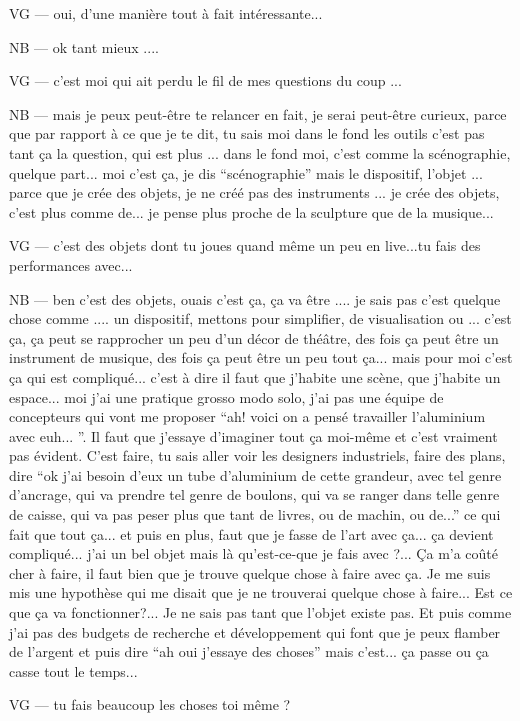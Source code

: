 VG — oui, d'une manière tout à fait intéressante...

NB — ok tant mieux ....

VG — c'est moi qui ait perdu le fil de mes questions du coup ... 

NB — mais je peux peut-être te relancer en fait, je serai peut-être curieux, parce que par rapport à ce que je te dit, tu sais moi dans le fond les outils c'est pas tant ça la question, qui est plus ... dans le fond moi, c'est comme la scénographie, quelque part... moi c'est ça, je dis ``scénographie'' mais le dispositif, l'objet ...  parce que je crée des objets, je ne créé pas des instruments ... je crée des objets, c'est plus comme de... je pense plus proche de la sculpture que de la musique... 

VG — c'est des objets dont tu joues quand même un peu en live...tu fais des performances avec...

NB — ben c'est des objets, ouais c'est ça, ça va être ....  je sais pas c'est quelque chose comme .... un dispositif, mettons pour simplifier, de visualisation ou ... c'est ça, ça peut se rapprocher un peu d'un décor de théâtre, des fois ça peut être un instrument de musique, des fois ça peut être un peu tout ça...  mais pour moi c'est ça qui est compliqué... c'est à dire il faut que j'habite une scène, que j'habite un espace... moi j'ai une pratique grosso modo solo, j'ai pas une équipe de concepteurs qui vont me proposer ``ah! voici on a pensé travailler l'aluminium avec euh... ''. Il faut que j'essaye d'imaginer tout ça moi-même et c'est vraiment pas évident. C'est faire, tu sais aller voir les designers industriels, faire des plans, dire ``ok j'ai besoin d'eux un tube d'aluminium de cette grandeur, avec tel genre d'ancrage, qui va prendre tel genre de boulons, qui va se ranger dans telle genre de caisse, qui va pas peser plus que tant de livres, ou de  machin, ou de...'' ce qui fait que tout ça... et puis en plus, faut que je fasse de l'art avec ça... ça devient compliqué... j'ai un bel objet mais là qu'est-ce-que je fais avec ?... Ça m'a coûté cher à faire, il faut bien que je trouve quelque chose à faire avec ça. Je me suis mis une hypothèse qui me disait que je ne trouverai quelque chose à faire... Est ce que ça va fonctionner?... Je ne sais pas tant que l'objet existe pas. Et puis comme j'ai pas des budgets de recherche et développement qui font que je peux flamber de l'argent et puis dire ``ah oui j'essaye des choses''  mais c'est... ça passe ou ça casse tout le temps... 

VG — tu fais beaucoup les choses toi même ?

